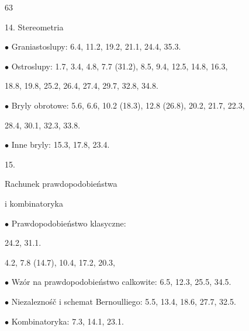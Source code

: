 \documentclass[a4paper,12pt]{article}
\begin{document}
63

14. Stereometria

$\bullet$ Graniastoslupy: 6.4, 11.2, 19.2, 21.1, 24.4, 35.3.

$\bullet$ Ostroslupy: 1.7, 3.4, 4.8, 7.7 (31.2), 8.5, 9.4, 12.5, 14.8, 16.3,

18.8, 19.8, 25.2, 26.4, 27.4, 29.7, 32.8, 34.8.

$\bullet$ Bryly obrotowe: 5.6, 6.6, 10.2 (18.3), 12.8 (26.8), 20.2, 21.7, 22.3,

28.4, 30.1, 32.3, 33.8.

$\bullet$ Inne bryly: 15.3, 17.8, 23.4.

15.

Rachunek prawdopodobieństwa

i kombinatoryka

$\bullet$ Prawdopodobieństwo klasyczne:

24.2, 31.1.

4.2, 7.8 (14.7), 10.4, 17.2, 20.3,

$\bullet$ Wzór na prawdopodobieństwo calkowite: 6.5, 12.3, 25.5, 34.5.

$\bullet$ Niezaleznośč $\mathrm{i}$ schemat Bernoulliego: 5.5, 13.4, 18.6, 27.7, 32.5.

$\bullet$ Kombinatoryka: 7.3, 14.1, 23.1.
\end{document}
